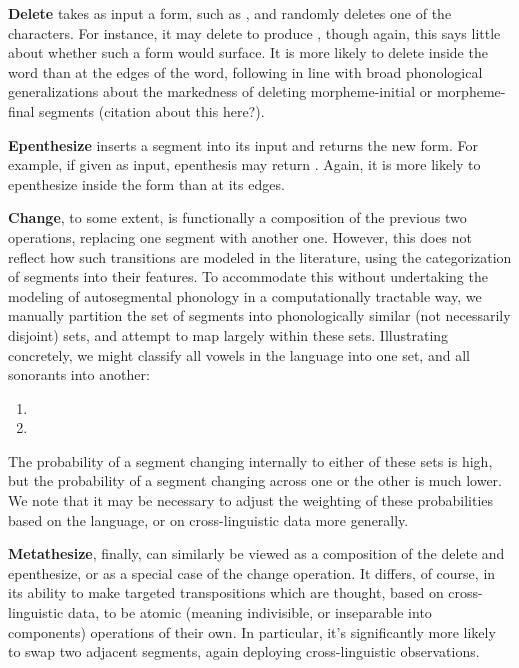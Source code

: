 \documentclass[12pt]{article}
\begin{document}
\textbf{Delete} takes as input a form, such as \textipa{[sol\'u]}, and
randomly deletes one of the characters. For instance, it may delete
\textipa{[o]} to produce \textipa{[sl\'u]}, though again, this says little
about whether such a form would surface. It is more likely to delete inside the
word than at the edges of the word, following in line with broad phonological
generalizations about the markedness of deleting morpheme-initial or
morpheme-final segments (citation about this here?).

\textbf{Epenthesize} inserts a segment into its input and returns the new form.
For example, if given \textipa{[sol\'u]} as input, epenthesis may return
\textipa{[sool\'u]}. Again, it is more likely to epenthesize inside the form
than at its edges.

\textbf{Change}, to some extent, is functionally a composition of the previous
two operations, replacing one segment with another one. However, this does not
reflect how such transitions are modeled in the literature, using the
categorization of segments into their features. To accommodate this without
undertaking the modeling of autosegmental phonology
\cite{goldsmith1990autosegmental} in a computationally tractable way, we
manually partition the set of segments into phonologically similar (not
necessarily disjoint) sets, and attempt to map largely within these sets.
Illustrating concretely, we might classify all vowels in the language into one
set, and all sonorants into another:

\begin{enumerate}
    \item {}
    \item {}
\end{enumerate}

The probability of a segment changing internally to either of these sets is
high, but the probability of a segment changing across one or the other is much
lower. We note that it may be necessary to adjust the weighting of these
probabilities based on the language, or on cross-linguistic data more generally.

\textbf{Metathesize}, finally, can similarly be viewed as a composition of the
delete and epenthesize, or as a special case of the change operation. It
differs, of course, in its ability to make targeted transpositions which are
thought, based on cross-linguistic data, to be atomic (meaning indivisible, or
inseparable into components) operations of their own. In particular, it's
significantly more likely to swap two adjacent segments, again deploying
cross-linguistic observations.
\end{document}

